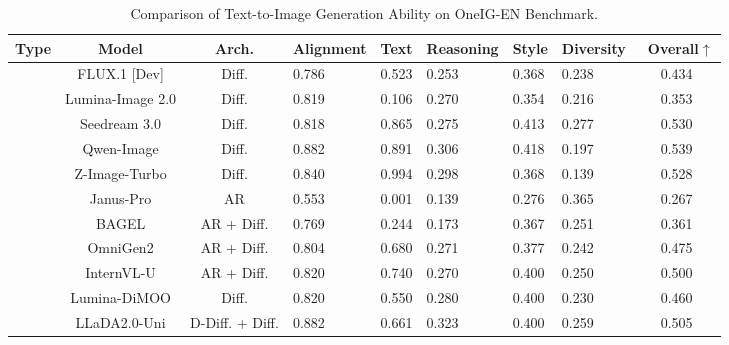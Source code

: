\begin{table}[!tb]
\centering
\renewcommand{\arraystretch}{1.2}
\setlength\tabcolsep{3pt}
\small
{}

\caption{Comparison of Text-to-Image Generation Ability on OneIG-EN Benchmark.}
\begin{tabularx}{\linewidth}{ccc| *{5}{C}|c} 
\toprule
\textbf{Type} & \textbf{Model} & \textbf{Arch.} & \textbf{Alignment} &\textbf{Text} &\textbf{Reasoning} &\textbf{Style} &\textbf{Diversity} &\textbf{~Overall$\uparrow$} \\
\midrule
{} 
& FLUX.1 [Dev] & Diff. & 0.786 & 0.523 & 0.253 & 0.368 & 0.238 & 0.434 \\
& Lumina-Image 2.0 & Diff. & 0.819 &0.106 &0.270 & 0.354 &0.216 & 0.353 \\
& Seedream 3.0 & Diff. &0.818 &0.865 &0.275 &0.413 &0.277 &0.530 \\
& Qwen-Image & Diff. &0.882 &0.891 &0.306 &0.418 &0.197 &0.539 \\
& Z-Image-Turbo & Diff. &0.840 &0.994 &0.298 &0.368 &0.139 &0.528 \\

\midrule
{} 
& Janus-Pro & AR & 0.553 & 0.001 & 0.139 & 0.276 & 0.365 & 0.267 \\
& BAGEL & AR + Diff. & 0.769 & 0.244 & 0.173 & 0.367 & 0.251 & 0.361 \\
& OmniGen2 & AR + Diff. & 0.804 &0.680 &0.271 &0.377 &0.242 &0.475 \\
& InternVL-U & AR + Diff. &0.820 &0.740 &0.270 &0.400 &0.250 &0.500\\
& Lumina-DiMOO & Diff. &0.820& 0.550& 0.280& 0.400& 0.230 & 0.460  \\
&LLaDA2.0-Uni &D-Diff. + Diff. &0.882 & 0.661 &0.323 &0.400 &0.259 &0.505 \\
\bottomrule
\end{tabularx}
\label{table:oneig_en}
\vspace{-0.06in}
\end{table}